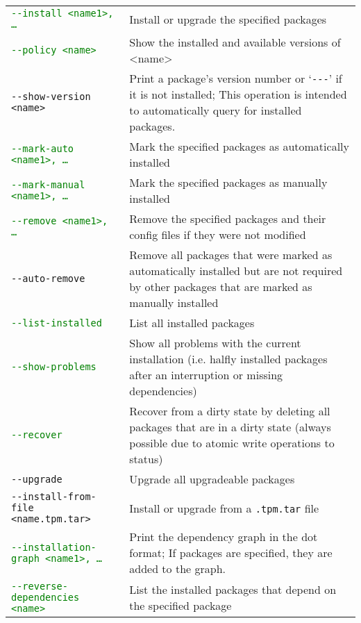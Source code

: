 \documentclass[a4paper]{article}
\newcommand{\green}[1]{\textcolor{green}{#1}}
\begin{document}
	\bgroup
	\def\arraystretch{1.5}
	\begin{tabularx}{\textwidth}{lX}
		\green{\texttt{-{}-install <name1>, \dots}} & Install or upgrade the specified packages \\
		
		\green{\texttt{-{}-policy <name>}} & Show the installed and available versions of <name> \\
		
		\texttt{-{}-show-version <name>} & Print a package's version number or `\texttt{-{}-{}-}' if it is not installed; This operation is intended to automatically query for installed packages. \\
		
		\green{\texttt{-{}-mark-auto <name1>, \dots}} & Mark the specified packages as automatically installed \\
		
		\green{\texttt{-{}-mark-manual <name1>, \dots}} & Mark the specified packages as manually installed \\
		
		\green{\texttt{-{}-remove <name1>, \dots}} & Remove the specified packages and their config files if they were not modified \\
		
		\texttt{-{}-auto-remove} & Remove all packages that were marked as automatically installed but are not required by other packages that are marked as manually installed \\
		
		\green{\texttt{-{}-list-installed}} & List all installed packages \\
		
		\green{\texttt{-{}-show-problems}} & Show all problems with the current installation (i.e. halfly installed packages after an interruption or missing dependencies) \\
		
		\green{\texttt{-{}-recover}} & Recover from a dirty state by deleting all packages that are in a dirty state (always possible due to atomic write operations to status) \\
		
		\texttt{-{}-upgrade} & Upgrade all upgradeable packages \\
		
		\texttt{-{}-install-from-file <name.tpm.tar>} & Install or upgrade from a \texttt{.tpm.tar} file \\
		
		\green{\texttt{-{}-installation-graph <name1>, \dots}} & Print the dependency graph in the dot format; If packages are specified, they are added to the graph. \\
		
		\green{\texttt{-{}-reverse-dependencies <name>}} & List the installed packages that depend on the specified package \\
		
	\end{tabularx}
	\egroup
\end{document}
